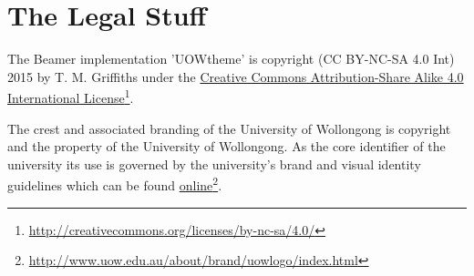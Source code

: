\documentclass[aspectratio=169]{beamer}
\begin{document}
\section{The Legal Stuff}


\begin{frame}
The Beamer implementation 'UOWtheme' is copyright (CC BY-NC-SA 4.0 Int) 2015 by T. M. Griffiths under the \href{http://creativecommons.org/licenses/by-sa/4.0/}{Creative Commons Attribution-Share Alike 4.0 International License}\footnote{\url{http://creativecommons.org/licenses/by-nc-sa/4.0/}}.
   
\begin{center}\color{UOWdarkred}\ccbysa\end{center}
   
The crest and associated branding of the University of Wollongong is copyright and the property of the University of Wollongong. As the core identifier of the university its use is governed by the university's brand and visual identity guidelines which can be found \href{http://www.uow.edu.au/about/brand/uowlogo/index.html}{online}\footnote{\url{http://www.uow.edu.au/about/brand/uowlogo/index.html}}.
   
\end{frame}
\end{document}
